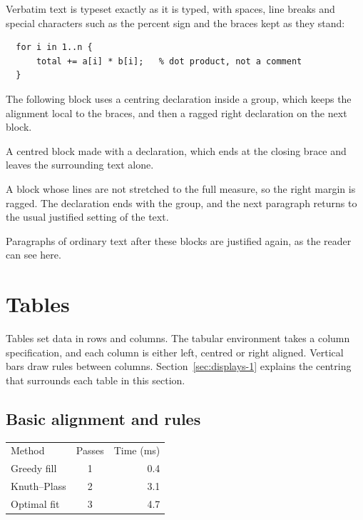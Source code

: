 \documentclass{article}
\begin{document}
Verbatim text is typeset exactly as it is typed, with spaces, line breaks and special
characters such as the percent sign and the braces kept as they stand:

\begin{verbatim}
  for i in 1..n {
      total += a[i] * b[i];   % dot product, not a comment
  }
\end{verbatim}

The following block uses a centring declaration inside a group, which keeps the
alignment local to the braces, and then a ragged right declaration on the next block.

{\centering A centred block made with a declaration, which ends at the closing
brace and leaves the surrounding text alone.\par}

{\raggedright A block whose lines are not stretched to the full measure, so the
right margin is ragged. The declaration ends with the group, and the next paragraph
returns to the usual justified setting of the text.\par}

Paragraphs of ordinary text after these blocks are justified again, as the reader can
see here.

\section{Tables}\label{sec:tables-1}

Tables set data in rows and columns. The tabular environment takes a column
specification, and each column is either left, centred or right aligned. Vertical bars
draw rules between columns. Section~\ref{sec:displays-1} explains the centring that surrounds each table in
this section.

\subsection{Basic alignment and rules}\label{sec:tables-basic-1}

\begin{center}
\begin{tabular}{l c r}
Method & Passes & Time (ms) \\
Greedy fill      & 1 & 0.4 \\
Knuth--Plass     & 2 & 3.1 \\
Optimal fit      & 3 & 4.7 \\
\end{tabular}
\end{center}
\end{document}
